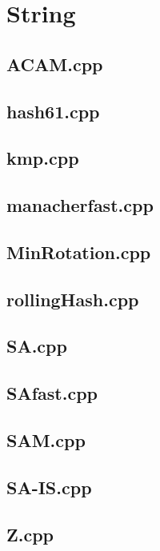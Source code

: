 \section{String}

\subsection{ACAM.cpp}


\subsection{hash61.cpp}


\subsection{kmp.cpp}


\subsection{manacherfast.cpp}


\subsection{MinRotation.cpp}


\subsection{rollingHash.cpp}


\subsection{SA.cpp}


\subsection{SAfast.cpp}


\subsection{SAM.cpp}


\subsection{SA-IS.cpp}


\subsection{Z.cpp}


